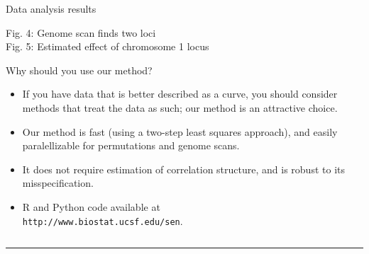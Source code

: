 \documentclass[final,plain]{beamer}
\newlength{\sepwid}
\newlength{\onecolwid}
\newlength{\twocolwid}
\begin{document}
\begin{frame}[t]
\begin{columns}[t]
\begin{column}{\onecolwid}
\begin{block}{Data analysis results}
      \begin{center}
        {\sffamily \color{jblue} Fig. 4: Genome scan finds two loci}
        \\ {\sffamily
          \color{jblue} Fig. 5: Estimated effect of chromosome 1 locus}
      \end{center}
    \end{block}
    
    
    \begin{alertblock}{Why should you use our method?}
      \begin{itemize}
        \item If you have data that is better described as a curve,
          you should consider methods that treat the data as such; our
          method is an attractive choice.
        \item Our method is fast (using a two-step least squares
          approach), and easily paralellizable for permutations and
          genome scans.
        \item It does not require estimation of correlation structure,
          and is robust to its misspecification.
        \item R and Python code available at 
      \\{\tt http://www.biostat.ucsf.edu/sen}.
      \end{itemize}
    \end{alertblock}

  \end{column}
  
\begin{column}{\sepwid}
  \end{column}                 %
  
\end{columns}

\hrule




\end{frame}
\end{document}
